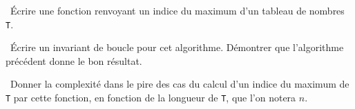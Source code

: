 \question\ Écrire une fonction \python{} renvoyant un indice du maximum d'un tableau de nombres \texttt{T}.

\medskip

\question\ Écrire un invariant de boucle pour cet algorithme. Démontrer que l'algorithme précédent donne le bon résultat.

\medskip

\question\ Donner la complexité dans le pire des cas du calcul d'un indice du maximum de \texttt{T} par cette 
fonction, en fonction de la longueur de \texttt{T}, que l'on notera $n$. 